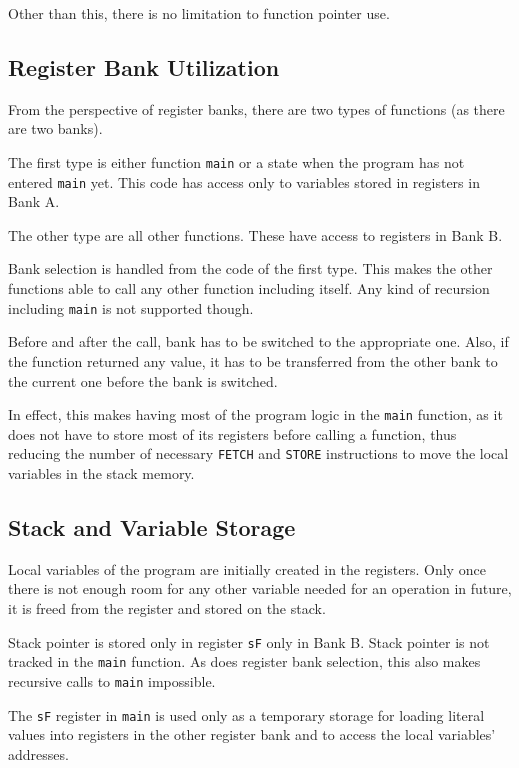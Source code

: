         Other than this, there is no limitation to function pointer use.

        \subsection{Register Bank Utilization}

        From the perspective of register banks, there are two types of functions (as there are two banks). 

        The first type is either function \texttt{main} or a state when the program has not entered \texttt{main} yet. This code has access only to variables stored in registers in Bank A.

        The other type are all other functions. These have access to registers in Bank B.

        Bank selection is handled from the code of the first type. This makes the other functions able to call any other function including itself. Any kind of recursion including \texttt{main} is not supported though.

        Before and after the call, bank has to be switched to the appropriate one. Also, if the function returned any value, it has to be transferred from the other bank to the current one before the bank is switched.

        In effect, this makes having most of the program logic in the \texttt{main} function, as it does not have to store most of its registers before calling a function, thus reducing the number of necessary \texttt{FETCH} and \texttt{STORE} instructions to move the local variables in the stack memory.

        \subsection{Stack and Variable Storage}

        Local variables of the program are initially created in the registers. Only once there is not enough room for any other variable needed for an operation in future, it is freed from the register and stored on the stack.

        Stack pointer is stored only in register \texttt{sF} only in Bank B. Stack pointer is not tracked in the \texttt{main} function. As does register bank selection, this also makes recursive calls to \texttt{main} impossible.

        The \texttt{sF} register in \texttt{main} is used only as a temporary storage for loading literal values into registers in the other register bank and to access the local variables' addresses.

